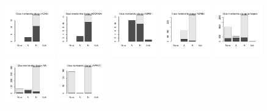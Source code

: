 \documentclass[10pt,article]{memoir}
\begin{document}
\begin{figure}[h!]
\includegraphics[width=0.19\textwidth]{figures/validation_plots/ache_0p8_valplot.pdf}
\includegraphics[width=0.19\textwidth]{figures/validation_plots/adora2a_0p8_valplot.pdf}
\includegraphics[width=0.19\textwidth]{figures/validation_plots/adrb1_0p8_valplot.pdf}
\includegraphics[width=0.19\textwidth]{figures/validation_plots/adrb2_0p8_valplot.pdf}
\includegraphics[width=0.19\textwidth]{figures/validation_plots/alltargets_0p8_valplot.pdf}
\includegraphics[width=0.19\textwidth]{figures/validation_plots/ar_0p8_valplot.pdf}
\includegraphics[width=0.19\textwidth]{figures/validation_plots/avpr1a_0p8_valplot.pdf}

\end{figure}
\end{document}
